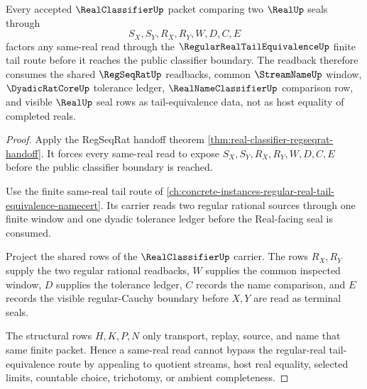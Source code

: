 \begin{theorem}
\label{thm:real-classifier-regular-real-tail-equivalence-readback}
Every accepted $\RealClassifierUp$ packet comparing two $\RealUp$ seals through
$$
S_X,S_Y,R_X,R_Y,W,D,C,E
$$
factors any same-real read through the $\RegularRealTailEquivalenceUp$ finite tail route before it reaches the public classifier boundary. The readback therefore consumes the shared $\RegSeqRatUp$ readbacks, common $\StreamNameUp$ window, $\DyadicRatCoreUp$ tolerance ledger, $\RealNameClassifierUp$ comparison row, and visible $\RealUp$ seal rows as tail-equivalence data, not as host equality of completed reals.
\end{theorem}
\begin{proof}
Apply the RegSeqRat handoff theorem \autoref{thm:real-classifier-regseqrat-handoff}. It forces every same-real read to expose $S_X,S_Y,R_X,R_Y,W,D,C,E$ before the public classifier boundary is reached.

Use the finite same-real tail route of \autoref{ch:concrete-instances-regular-real-tail-equivalence-namecert}. Its carrier reads two regular rational sources through one finite window and one dyadic tolerance ledger before the Real-facing seal is consumed.

Project the shared rows of the $\RealClassifierUp$ carrier. The rows $R_X,R_Y$ supply the two regular rational readbacks, $W$ supplies the common inspected window, $D$ supplies the tolerance ledger, $C$ records the name comparison, and $E$ records the visible regular-Cauchy boundary before $X,Y$ are read as terminal seals.

The structural rows $H,K,P,N$ only transport, replay, source, and name that same finite packet. Hence a same-real read cannot bypass the regular-real tail-equivalence route by appealing to quotient streams, host real equality, selected limits, countable choice, trichotomy, or ambient completeness.
\end{proof}

